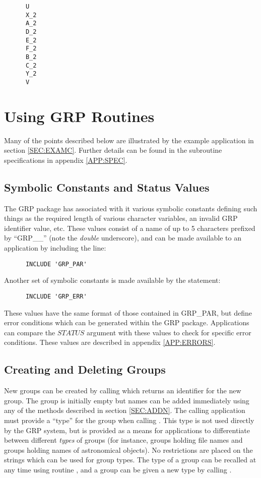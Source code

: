 \small
\begin{verbatim}
      U
      X_2
      A_2
      D_2
      E_2
      F_2
      B_2
      C_2
      Y_2
      V
\end{verbatim}
\normalsize


\section{Using GRP Routines}

Many of the points described below are illustrated by the example application in
section \ref{SEC:EXAMC}. Further details can be found in the subroutine
specifications in appendix \ref{APP:SPEC}.

\subsection{Symbolic Constants and Status Values}
The GRP package has associated with it various symbolic constants defining such
things as the required length of various character variables, an invalid GRP
identifier value, etc. These values consist of a name of up to 5 characters
prefixed by ``GRP\_\_''  (note the {\em double} underscore), and can be made
available to an application by including the line:

\small
\begin{verbatim}
      INCLUDE 'GRP_PAR'
\end{verbatim}
\normalsize

Another set of symbolic constants is made available by the
statement:

\small
\begin{verbatim}
      INCLUDE 'GRP_ERR'
\end{verbatim}
\normalsize

These values have the same format of those contained in GRP\_PAR, but define
error conditions which can be generated within the GRP package. Applications can
compare the $STATUS$ argument with these values to check for specific error
conditions. These values are described in appendix \ref {APP:ERRORS}.

\subsection{Creating and Deleting Groups}
New groups can be created by calling  which returns an identifier for
the new group. The group is initially empty but names can be added immediately
using any of the methods described in section \ref{SEC:ADDN}. The calling
application must provide a ``type'' for the group when calling . This
type is not used directly by the GRP system, but is provided as a means for
applications to differentiate between different {\em types} of groups (for
instance, groups holding file names and groups holding names of astronomical
objects). No restrictions are placed on the strings which can be used for
group types. The type of a group can be recalled at any time using routine
, and a group can be given a new type by calling .

